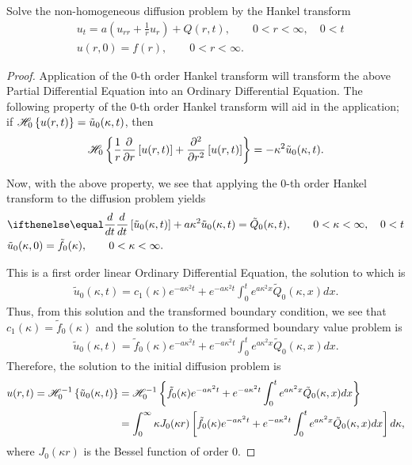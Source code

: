 \begin{problem}{1}
  Solve the non-homogeneous diffusion problem by the Hankel transform
  \begin{align*}
    &u_t = a\left(u_{rr} + \frac{1}{r}u_r\right) + Q(r, t), \qquad 0 < r < \infty, \quad 0 < t \\
    &u(r, 0) = f(r), \qquad 0 < r < \infty.
  \end{align*}
\end{problem}

\begin{proof}
  Application of the 0-th order Hankel transform will transform the above
  Partial Differential Equation into an Ordinary Differential Equation. The following property
  of the 0-th order Hankel transform will aid in the application;
  if $\mathscr{H}_{ {0} }\left\{ {u(r, t)} \right\} = \tilde{u}_0(\kappa, t)$,
  then
  \begin{align}
    \mathscr{H}_{ {0} }\left\{ {\frac{1}{r}\frac{\partial}{\partial r}\left[u(r, t)\right] + \frac{\partial^2}{\partial r^2}\left[u(r, t)\right]} \right\} = -\kappa^2 \tilde{u}_0(\kappa, t).
  \end{align}

  Now, with the above property, we see that applying the 0-th order Hankel transform
  to the diffusion problem yields
  \begin{align*}
    &\der{t}{}\left[\tilde{u}_0(\kappa, t)\right] + a\kappa^2 \tilde{u}_0(\kappa, t) = \tilde{Q}_0(\kappa, t) , \qquad 0 < \kappa < \infty, \quad 0 < t \\
    &\tilde{u}_0(\kappa, 0) = \tilde{f}_0(\kappa), \qquad 0 < \kappa < \infty.
  \end{align*}

  This is a first order linear Ordinary Differential Equation, the solution to which is
  \begin{align*}
    \tilde{u}_0(\kappa, t) = c_1(\kappa)e^{-a\kappa^2 t} + e^{-a\kappa^2 t}\int_0^t e^{a\kappa^2 x}\tilde{Q}_0(\kappa, x) dx.
  \end{align*}
  Thus, from this solution and the transformed boundary condition, we see that $c_1(\kappa) = \tilde{f}_0(\kappa)$ and the solution to the transformed
  boundary value problem is
  \begin{align*}
    \tilde{u}_0(\kappa, t) = \tilde{f}_0(\kappa)e^{-a\kappa^2 t} + e^{-a\kappa^2 t}\int_0^t e^{a\kappa^2 x}\tilde{Q}_0(\kappa, x) dx.
  \end{align*}
  Therefore, the solution to the initial diffusion problem is
  \begin{align*}
    u(r, t) = \mathscr{H}^{-1}_{ {0} }\left\{ {\tilde{u}_0(\kappa, t)} \right\}
    &= \mathscr{H}^{-1}_{ {0} }\left\{ {\tilde{f}_0(\kappa)e^{-a\kappa^2 t} + e^{-a\kappa^2 t}\int_0^t e^{a\kappa^2 x}\tilde{Q}_0(\kappa, x) dx} \right\} \\
    &= \int_0^\infty \kappa J_0(\kappa r)\left[\tilde{f}_0(\kappa)e^{-a\kappa^2 t} + e^{-a\kappa^2 t}\int_0^t e^{a\kappa^2 x}\tilde{Q}_0(\kappa, x) dx\right] d\kappa,
  \end{align*}
  where $J_0(\kappa r)$ is the Bessel function of order 0.

\end{proof}
\newpage

